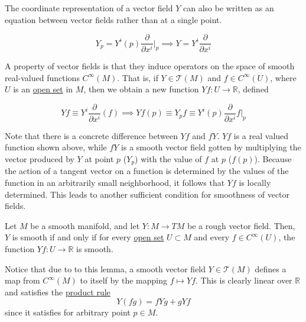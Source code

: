 \documentclass{article}
\begin{document}
    The coordinate representation of a vector field $Y$ can also be written as an equation between vector fields rather than at a single point.

      \begin{equation}
        Y_p = Y^i (p) \frac{\partial}{\partial x^i} \bigg|_p \implies Y = Y^i \frac{\partial}{\partial x^i}
      \end{equation}

    A property of vector fields is that they induce operators on the space of smooth real-valued functions $C^\infty (M)$. That is, if $Y \in \mathcal{T}(M)$ and $f \in C^\infty (U)$, where $U$ is an \hyperref[pst-def:open-set]{open set} in $M$, then we obtain a new function $Y f: U \to \mathbb{R}$, defined 

      \begin{equation}
        Y f \equiv Y^i \frac{\partial}{\partial x^i} (f) \implies Y f(p) \equiv Y_p f \equiv Y^i (p) \frac{\partial}{\partial x^i} f \bigg|_p
      \end{equation}

    Note that there is a concrete difference between $Y f$ and $f Y$. $Y f$ is a real valued function shown above, while $f Y$ is a smooth vector field gotten by multiplying the vector produced by $Y$ at point $p$ ($Y_p$) with the value of $f$ at $p$ ($f(p)$). Because the action of a tangent vector on a function is determined by the values of the function in an arbitrarily small neighborhood, it follows that $Y f$ is locally determined. This leads to another sufficient condition for smoothness of vector fields. 

    \begin{lemma}
      \label{thm:smoothness-criterion-for-a-rough-vector-field}
      Let $M$ be a smooth manifold, and let $Y: M \to TM$ be a rough vector field. Then, $Y$ is smooth if and only if for every \hyperref[pst-def:open-set]{open set} $U \subset M$ and every $f \in C^\infty (U)$, the function $Y f: U \to \mathbb{R}$ is smooth. 
    \end{lemma}

    Notice that due to to this lemma, a smooth vector field $Y \in \mathcal{T}(M)$ defines a map from $C^\infty(M)$ to itself by the mapping $f \mapsto Y f$. This is clearly linear over $\mathbb{R}$ and satisfies the \hyperref[mv-thm:product-rule-2]{product rule} 
      \begin{equation}
        Y(f g) = f Y g + g Y f
      \end{equation}
    since it satisfies for arbitrary point $p \in M$. 
\end{document}
